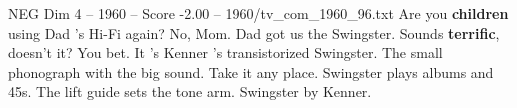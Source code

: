 \begin{textsample}{NEG Dim 4 – 1960 – Score -2.00 – 1960/tv\_com\_1960\_96.txt}  \label{ex:f4_neg_085}
Are you \textbf{children} using Dad 's Hi-Fi again?
No, Mom.
Dad got us the Swingster.
Sounds \textbf{terrific}, doesn't it?
You bet.
It 's Kenner 's transistorized Swingster.
The small phonograph with the big sound.
Take it any place.
Swingster plays albums and 45s.
The lift guide sets the tone arm.
Swingster by Kenner.

\end{textsample}
